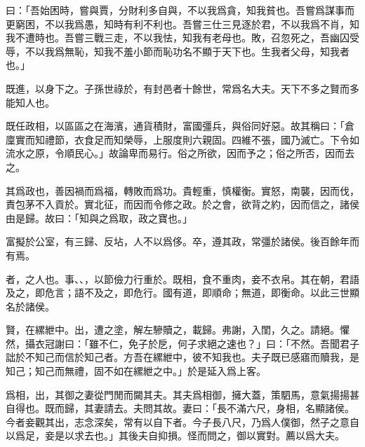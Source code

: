 曰：「吾始困時，嘗與賈，分財利多自與，不以我爲貪，知我貧也。吾嘗爲謀事而更窮困，不以我爲愚，知時有利不利也。吾嘗三仕三見逐於君，不以我爲不肖，知我不遭時也。吾嘗三戰三走，不以我怯，知我有老母也。敗，召忽死之，吾幽囚受辱，不以我爲無恥，知我不羞小節而恥功名不顯于天下也。生我者父母，知我者也。」

既進，以身下之。子孫世祿於，有封邑者十餘世，常爲名大夫。天下不多之賢而多能知人也。

既任政相，以區區之在海濱，通貨積財，富國彊兵，與俗同好惡。故其稱曰：「倉廩實而知禮節，衣食足而知榮辱，上服度則六親固。四維不張，國乃滅亡。下令如流水之原，令順民心。」故論卑而易行。俗之所欲，因而予之；俗之所否，因而去之。

其爲政也，善因禍而爲福，轉敗而爲功。貴輕重，慎權衡。實怒，南襲，因而伐，責包茅不入貢於。實北征，而因而令修之政。於之會，欲背之約，因而信之，諸侯由是歸。故曰：「知與之爲取，政之寶也。」

富擬於公室，有三歸、反坫，人不以爲侈。卒，遵其政，常彊於諸侯。後百餘年而有焉。

者，之人也。事、、，以節儉力行重於。既相，食不重肉，妾不衣帛。其在朝，君語及之，即危言；語不及之，即危行。國有道，即順命；無道，即衡命。以此三世顯名於諸侯。

賢，在縲紲中。出，遭之塗，解左驂贖之，載歸。弗謝，入閨，久之。請絕。懼然，攝衣冠謝曰：「雖不仁，免子於戹，何子求絕之速也？」曰：「不然。吾聞君子詘於不知己而信於知己者。方吾在縲紲中，彼不知我也。夫子既已感寤而贖我，是知己；知己而無禮，固不如在縲紲之中。」於是延入爲上客。

爲相，出，其御之妻從門閒而闚其夫。其夫爲相御，擁大蓋，策駟馬，意氣揚揚甚自得也。既而歸，其妻請去。夫問其故。妻曰：「長不滿六尺，身相，名顯諸侯。今者妾觀其出，志念深矣，常有以自下者。今子長八尺，乃爲人僕御，然子之意自以爲足，妾是以求去也。」其後夫自抑損。怪而問之，御以實對。薦以爲大夫。

